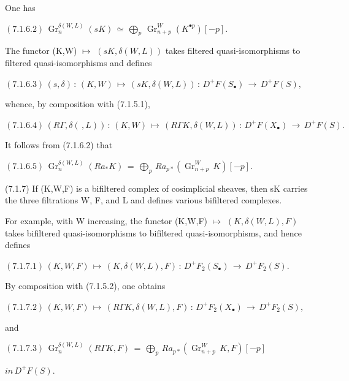 \documentclass[11pt,twoside]{article}
\newcommand{\DFormula}[1]{%
  \par\smallskip\noindent\hspace*{0pt}\(\displaystyle #1\)\par\smallskip
}
\begin{document}
One has\par
\par\medskip
\DFormula{(7.1.6.2)\,\operatorname{Gr}_{n}^{\delta (W,L)}(sK)\,\simeq \,⨁_{p}\,\operatorname{Gr}_{n+p}^{W}(K^{\bullet p})[−p].}
\par\medskip
The functor (K,W) \(↦\) \((sK,\delta (W,L))\) takes filtered quasi-isomorphisms to filtered quasi-isomorphisms and defines\par
\par\medskip
\DFormula{(7.1.6.3)\,(s,\delta )\,:\,(K,W)\,↦\,(sK,\delta (W,L))\,:\,D^{+}F(S_{\bullet })\,\to \,D^{+}F(S),}
\par\medskip
whence, by composition with (7.1.5.1),\par
\par\medskip
\DFormula{(7.1.6.4)\,(R\Gamma ,\delta (\,,L))\,:\,(K,W)\,↦\,(R\Gamma K,\delta (W,L))\,:\,D^{+}F(X_{\bullet })\,\to \,D^{+}F(S).}
\par\medskip
It follows from (7.1.6.2) that\par
\par\medskip
\DFormula{(7.1.6.5)\,\operatorname{Gr}_{n}^{\delta (W,L)}(Ra_{\ast }K)\,=\,⨁_{p}\,Ra_{p\ast }(\operatorname{Gr}_{n+p}^{W}\,K)[−p].}
\par\medskip
(7.1.7) If (K,W,F) is a bifiltered complex of cosimplicial sheaves, then sK carries the three filtrations W, F, and L and defines various bifiltered complexes.\par
\par\medskip
For example, with W increasing, the functor (K,W,F) \(↦\) \((K,\delta (W,L),F)\) takes bifiltered quasi-isomorphisms to bifiltered quasi-isomorphisms, and hence defines\par
\par\medskip
\DFormula{(7.1.7.1)\,(K,W,F)\,↦\,(K,\delta (W,L),F)\,:\,D^{+}F_{2}(S_{\bullet })\,\to \,D^{+}F_{2}(S).}
\par\medskip
By composition with (7.1.5.2), one obtains\par
\par\medskip
\DFormula{(7.1.7.2)\,(K,W,F)\,↦\,(R\Gamma K,\delta (W,L),F)\,:\,D^{+}F_{2}(X_{\bullet })\,\to \,D^{+}F_{2}(S),}
\par\medskip
and\par
\par\medskip
\DFormula{(7.1.7.3)\,\operatorname{Gr}_{n}^{\delta (W,L)}(R\Gamma K,F)\,=\,⨁_{p}\,Ra_{p\ast }(\operatorname{Gr}_{n+p}^{W}\,K,F)[−p]}
\par\medskip
\DFormula{in\,D^{+}F(S).}
\par\medskip
\end{document}
